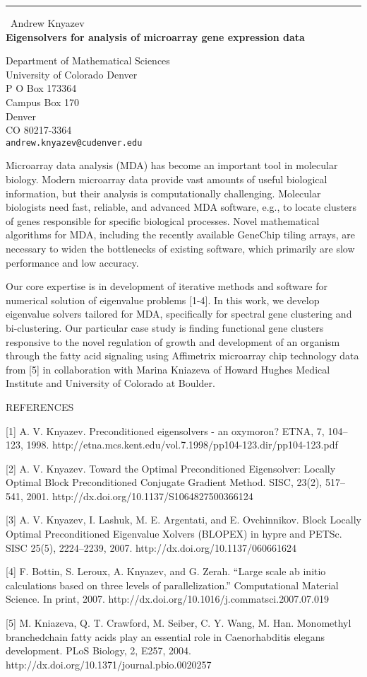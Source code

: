 \documentclass{report}
\begin{document}
\begin{center}
\rule{6in}{1pt} \
{\large Andrew Knyazev \\
{\bf Eigensolvers for analysis of microarray gene expression data}}

Department of Mathematical Sciences \\ University of Colorado Denver \\ P O Box 173364 \\ Campus Box 170 \\ Denver \\ CO 80217-3364
\\
{\tt andrew.knyazev@cudenver.edu}\end{center}

Microarray data analysis (MDA) has become an important tool in molecular
biology. Modern microarray data provide vast amounts of useful biological
information, but their analysis is computationally challenging. Molecular
biologists need fast, reliable, and advanced MDA software, e.g., to
locate clusters
of genes responsible for specific biological processes. Novel
mathematical algorithms for MDA, including the recently available
GeneChip tiling arrays, are necessary to widen the bottlenecks of
existing software, which primarily are slow performance and low accuracy.

Our core expertise is in development of iterative methods and software
for numerical solution of eigenvalue problems [1-4]. In this work, we
develop eigenvalue solvers tailored for MDA, specifically for spectral
gene clustering and bi-clustering. Our particular case study is finding
functional gene clusters
responsive to the novel regulation of growth and development of an
organism through the fatty acid signaling using Affimetrix microarray
chip technology data from [5] in collaboration with Marina Kniazeva of
Howard Hughes Medical Institute and University of Colorado at Boulder.

REFERENCES

[1] A. V. Knyazev. Preconditioned eigensolvers - an oxymoron? ETNA, 7,
104--123, 1998.
http://etna.mcs.kent.edu/vol.7.1998/pp104-123.dir/pp104-123.pdf

[2] A. V. Knyazev. Toward the Optimal Preconditioned Eigensolver: Locally
Optimal Block Preconditioned Conjugate Gradient Method. SISC, 23(2),
517--541, 2001. http://dx.doi.org/10.1137/S1064827500366124

[3] A. V. Knyazev, I. Lashuk, M. E. Argentati, and E. Ovchinnikov. Block
Locally Optimal Preconditioned Eigenvalue Xolvers (BLOPEX) in hypre and
PETSc. SISC 25(5), 2224--2239, 2007. http://dx.doi.org/10.1137/060661624

[4] F. Bottin, S. Leroux, A. Knyazev, and G. Zerah. “Large scale ab
initio calculations based on three levels of parallelization.”
Computational Material Science. In print, 2007.
http://dx.doi.org/10.1016/j.commatsci.2007.07.019

[5] M. Kniazeva, Q. T. Crawford, M. Seiber, C. Y. Wang, M. Han.
Monomethyl branchedchain fatty acids play an essential role in
Caenorhabditis elegans development. PLoS Biology, 2, E257, 2004.
http://dx.doi.org/10.1371/journal.pbio.0020257
\end{document}
